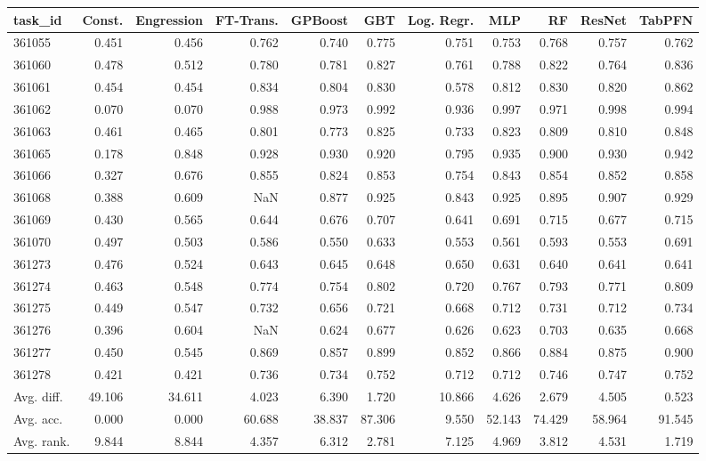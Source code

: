 \begin{tabular}{lrrrrrrrrrr}
\toprule
task\_id & Const. & Engression & FT-Trans. & GPBoost & GBT & Log. Regr. & MLP & RF & ResNet & TabPFN \\
\midrule
361055 & 0.451 & 0.456 & 0.762 & 0.740 & 0.775 & 0.751 & 0.753 & 0.768 & 0.757 & 0.762 \\
361060 & 0.478 & 0.512 & 0.780 & 0.781 & 0.827 & 0.761 & 0.788 & 0.822 & 0.764 & 0.836 \\
361061 & 0.454 & 0.454 & 0.834 & 0.804 & 0.830 & 0.578 & 0.812 & 0.830 & 0.820 & 0.862 \\
361062 & 0.070 & 0.070 & 0.988 & 0.973 & 0.992 & 0.936 & 0.997 & 0.971 & 0.998 & 0.994 \\
361063 & 0.461 & 0.465 & 0.801 & 0.773 & 0.825 & 0.733 & 0.823 & 0.809 & 0.810 & 0.848 \\
361065 & 0.178 & 0.848 & 0.928 & 0.930 & 0.920 & 0.795 & 0.935 & 0.900 & 0.930 & 0.942 \\
361066 & 0.327 & 0.676 & 0.855 & 0.824 & 0.853 & 0.754 & 0.843 & 0.854 & 0.852 & 0.858 \\
361068 & 0.388 & 0.609 & NaN & 0.877 & 0.925 & 0.843 & 0.925 & 0.895 & 0.907 & 0.929 \\
361069 & 0.430 & 0.565 & 0.644 & 0.676 & 0.707 & 0.641 & 0.691 & 0.715 & 0.677 & 0.715 \\
361070 & 0.497 & 0.503 & 0.586 & 0.550 & 0.633 & 0.553 & 0.561 & 0.593 & 0.553 & 0.691 \\
361273 & 0.476 & 0.524 & 0.643 & 0.645 & 0.648 & 0.650 & 0.631 & 0.640 & 0.641 & 0.641 \\
361274 & 0.463 & 0.548 & 0.774 & 0.754 & 0.802 & 0.720 & 0.767 & 0.793 & 0.771 & 0.809 \\
361275 & 0.449 & 0.547 & 0.732 & 0.656 & 0.721 & 0.668 & 0.712 & 0.731 & 0.712 & 0.734 \\
361276 & 0.396 & 0.604 & NaN & 0.624 & 0.677 & 0.626 & 0.623 & 0.703 & 0.635 & 0.668 \\
361277 & 0.450 & 0.545 & 0.869 & 0.857 & 0.899 & 0.852 & 0.866 & 0.884 & 0.875 & 0.900 \\
361278 & 0.421 & 0.421 & 0.736 & 0.734 & 0.752 & 0.712 & 0.712 & 0.746 & 0.747 & 0.752 \\
Avg. diff. & 49.106 & 34.611 & 4.023 & 6.390 & 1.720 & 10.866 & 4.626 & 2.679 & 4.505 & 0.523 \\
Avg. acc. & 0.000 & 0.000 & 60.688 & 38.837 & 87.306 & 9.550 & 52.143 & 74.429 & 58.964 & 91.545 \\
Avg. rank. & 9.844 & 8.844 & 4.357 & 6.312 & 2.781 & 7.125 & 4.969 & 3.812 & 4.531 & 1.719 \\
\bottomrule
\end{tabular}
